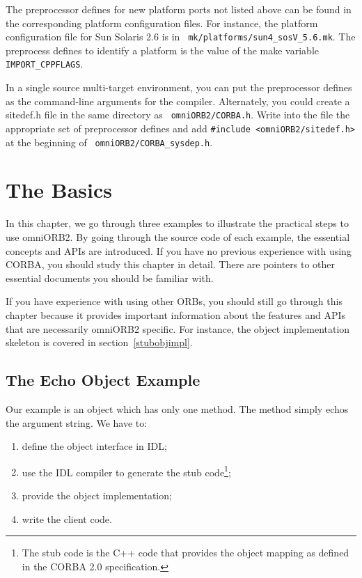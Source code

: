 \documentclass[11pt,twoside,onecolumn]{book}
\begin{document}
The preprocessor defines for new platform ports not listed above can be
found in the corresponding platform configuration files. For instance, the 
platform configuration file for Sun Solaris 2.6 is in {\tt
mk/platforms/sun4\_sosV\_5.6.mk}. The preprocess defines to identify a
platform is the value of the make variable {\tt IMPORT\_CPPFLAGS}.

In a single source multi-target environment, you can put the preprocessor
defines as the command-line arguments for the compiler. Alternately, you could
create a sitedef.h file in the same directory as {\tt
omniORB2/CORBA.h}. Write into the file the appropriate set of preprocessor
defines and add {\tt \#include <omniORB2/sitedef.h>} at the beginning of {\tt
omniORB2/CORBA\_sysdep.h}.

%
\chapter{The Basics}
\label{ch_basic}

In this chapter, we go through three examples to illustrate the practical
steps to use omniORB2. By going through the source code of each example,
the essential concepts and APIs are introduced. If you have no previous
experience with using CORBA, you should study this chapter in detail. There
are pointers to other essential documents you should be familiar with.

If you have experience with using other ORBs, you should still go through
this chapter because it provides important information about the features
and APIs that are necessarily omniORB2 specific. For instance, the object
implementation skeleton is covered in section~\ref{stubobjimpl}.

\section{The Echo Object Example}

Our example is an object which has only one method. The method simply echos
the argument string. We have to:

\begin{enumerate}

\item define the object interface in IDL;
\item use the IDL compiler to generate the stub code\footnote{The stub code
is the C++ code that provides the object mapping as defined in the CORBA 2.0
specification.};
\item provide the object implementation;
\item write the client code.

\end{enumerate}
\end{document}
